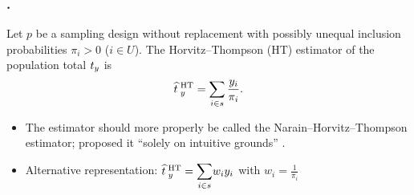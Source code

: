 \documentclass{my_eth_beamer}
\numberwithin{equation}{section}
\begin{document}
\begin{frame}
    \frametitle{\insertsectionnumber.\insertsubsectionnumber~\insertsubsection}
    \begin{Def}\label{def:sample}

        \vspace{-0.5em}

        Let $p$ be a sampling design without replacement with \alert{possibly
        unequal} inclusion probabilities $\pi_i>0$ ($i\in U$). The
        \alert{Horvitz--Thompson} (HT) estimator of the population total
        $t_y$ is
        \begin{equation*}
            \widehat{t}^{\;\mathrm{HT}}_{\;y} = \sum_{i \in s} \frac{y_i}{\pi_i}.
        \end{equation*}
    \end{Def}
    \begin{itemize}
    \setlength{\itemsep}{8pt}
        \item The estimator should more properly be called the
            \alert{Narain--Horvitz--Thompson} estimator; \citet{narain_1951}
            proposed it ``solely on intuitive grounds'' \citep[][p.
            55]{ajgaonkar_1967}.
        \item \alert{Alternative} representation: \quad $\widehat{t}^{\;\mathrm{HT}}_{\;y} =
            \displaystyle{\sum_{i \in s}} w_i y_i$ \quad with \quad $w_i =
            \displaystyle{\frac{1}{\pi_i}}$
    \end{itemize}
\end{frame}
\end{document}
